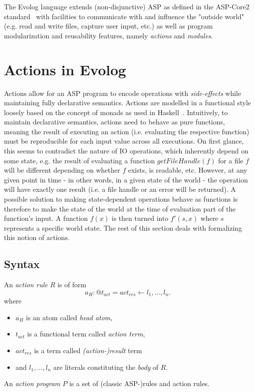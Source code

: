 The Evolog language extends (non-disjunctive) ASP as defined in the ASP-Core2 standard~\cite{asp-core2} with facilities to communicate with and influence the "outside world" (e.g. read and write files, capture user input, etc.) as well as program modularization and reusability features, namely \emph{actions} and \emph{modules}.

\section{Actions in Evolog}
\label{sec:evolog-actions}

Actions allow for an ASP program to encode operations with \emph{side-effects} while maintaining fully declarative semantics. Actions are modelled in a functional style loosely based on the concept of monads as used in Haskell~. Intuitively, to maintain declarative semantics, actions need to behave as pure functions, meaning the result of executing an action (i.e. evaluating the respective function) must be reproducible for each input value across all executions. On first glance, this seems to contradict the nature of IO operations, which inherently depend on some state, e.g. the result of evaluating a function $getFileHandle(f)$ for a file $f$ will be different depending on whether $f$ exists, is readable, etc. However, at any given point in time - in other words, in a given state of the world - the operation will have exactly one result (i.e. a file handle or an error will be returned). A possible solution to making state-dependent operations behave as functions is therefore to make the state of the world at the time of evaluation part of the function's input. A function $f(x)$ is then turned into $f'(s, x)$  where $s$ represents a specific world state. The rest of this section deals with formalizing this notion of actions.


\subsection{Syntax}
\label{subsec:evolog-actions-syntax}

\begin{definition}
\label{def:action-rule-syntax}
An \emph{action rule} $R$ is of form
\[
	a_H : @t_{act} = act_{res} \leftarrow l_1,\ldots,l_n.
\]
where
\begin{itemize}
	\item $a_H$ is an atom called \emph{head atom},
	\item $t_{act}$ is a functional term called \emph{action term},
	\item $act_{res}$ is a term called \emph{(action-)result} term
	\item and $l_1,\ldots,l_n$ are literals constituting the \emph{body} of $R$.
\end{itemize}
An \emph{action program} $P$ is a set of (classic ASP-)rules and action rules.
\end{definition}

